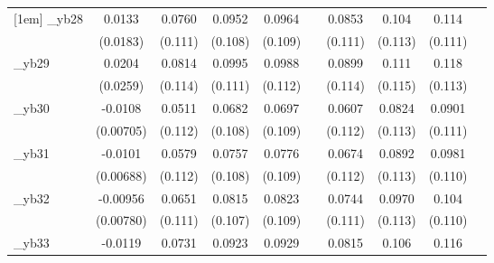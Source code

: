 \begin{table}[htbp]
\begin{tabular}{l*{9}{c}}
[1em]
\_yb28       &      0.0133         &      0.0760         &      0.0952         &      0.0964         &                     &      0.0853         &       0.104         &       0.114         &                     \\
            &    (0.0183)         &     (0.111)         &     (0.108)         &     (0.109)         &                     &     (0.111)         &     (0.113)         &     (0.111)         &                     \\
[1em]
\_yb29       &      0.0204         &      0.0814         &      0.0995         &      0.0988         &                     &      0.0899         &       0.111         &       0.118         &                     \\
            &    (0.0259)         &     (0.114)         &     (0.111)         &     (0.112)         &                     &     (0.114)         &     (0.115)         &     (0.113)         &                     \\
[1em]
\_yb30       &     -0.0108         &      0.0511         &      0.0682         &      0.0697         &                     &      0.0607         &      0.0824         &      0.0901         &                     \\
            &   (0.00705)         &     (0.112)         &     (0.108)         &     (0.109)         &                     &     (0.112)         &     (0.113)         &     (0.111)         &                     \\
[1em]
\_yb31       &     -0.0101         &      0.0579         &      0.0757         &      0.0776         &                     &      0.0674         &      0.0892         &      0.0981         &                     \\
            &   (0.00688)         &     (0.112)         &     (0.108)         &     (0.109)         &                     &     (0.112)         &     (0.113)         &     (0.110)         &                     \\
[1em]
\_yb32       &    -0.00956         &      0.0651         &      0.0815         &      0.0823         &                     &      0.0744         &      0.0970         &       0.104         &                     \\
            &   (0.00780)         &     (0.111)         &     (0.107)         &     (0.109)         &                     &     (0.111)         &     (0.113)         &     (0.110)         &                     \\
[1em]
\_yb33       &     -0.0119         &      0.0731         &      0.0923         &      0.0929         &                     &      0.0815         &       0.106         &       0.116         &                     \\

\end{tabular}
\end{table}

